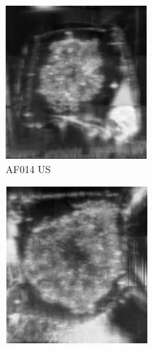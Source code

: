 \begin{figure}
\begin{subfigure}[b]{.24\linewidth}
\includegraphics[width=\linewidth]{Figs/US14_18.jpg}
\caption{AF014 US}
\end{subfigure}
\begin{subfigure}[b]{.24\linewidth}
\includegraphics[width=\linewidth]{Figs/US23_23.jpg}

\end{subfigure}
\end{figure}
